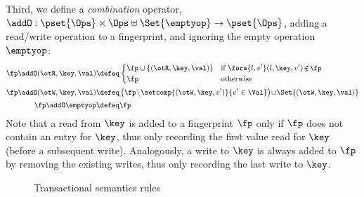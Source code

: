 Third, we define a \emph{combination} operator,
$\addO  : \pset{\Ops} \times \Ops \uplus \Set{\emptyop} \to \pset{\Ops}$, 
adding a read/write operation to a fingerprint, and ignoring the empty operation $\emptyop$:%
\[
\small
\begin{aligned}
    \fp \addO (\otR, \key, \val)  
    & \defeq
    \begin{cases}
        \fp \cup \{(\otR, \key, \val)\} & \text{if } \fora{l, v'} (l, \key, v') \! \notin \! \fp \\
        \fp &  \text{otherwise} \\
    \end{cases}  \\
    \fp \addO (\otW, \key, \val) 
    & \defeq 
    \left( \fp \! \setminus \! \setcomp{(\otW, \key, v')}{v' \in \Val} \right)  \!
    \cup \! \Set{(\otW, \key, \val)} \\
    \fp \addO \emptyop  & \defeq \fp 
\end{aligned}
\]
Note that a read from $\key$ is added to a fingerprint $\fp$ only if $\fp$ does not contain an entry for $\key$, thus only recording the first value read for $\key$ (before a subsequent write). 
Analogously, a write to $\key$ is always added to $\fp$ by removing the existing writes, thus only recording the last write to $\key$. 

%
\begin{figure*}[!t]
\small
{}
\hrulefill

\captionsetup{belowskip=-5pt}
\caption{Transactional semantics rules}
\label{fig:semantics-trans}
\end{figure*}

